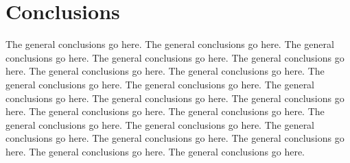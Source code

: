 \chapter{Conclusions}

\label{ch:con}

The general conclusions go here.
The general conclusions go here.
The general conclusions go here.
The general conclusions go here.
The general conclusions go here.
The general conclusions go here.
The general conclusions go here.
The general conclusions go here.
The general conclusions go here.
The general conclusions go here.
The general conclusions go here.
The general conclusions go here.
The general conclusions go here.
The general conclusions go here.
The general conclusions go here.
The general conclusions go here.
The general conclusions go here.
The general conclusions go here.
The general conclusions go here.
The general conclusions go here.
The general conclusions go here.

